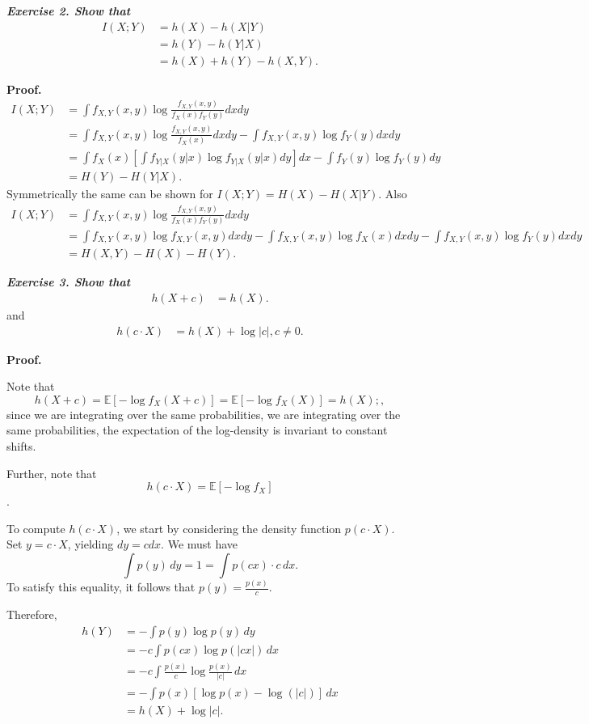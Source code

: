 \documentclass[13pt]{article}
\begin{document}
\textbf{\textit{Exercise 2.   Show that}}
\begin{align*}
I(X; Y) &= h(X) - h(X | Y) \\
		&= h(Y) - h(Y | X) \\
        &= h(X) + h(Y) - h(X, Y).
\end{align*}

\textbf{Proof.}
\begin{align*}
I(X;Y)&=\int f_{X,Y}(x,y)\log\frac{f_{X,Y}(x,y)}{f_X(x)f_Y(y)}dxdy\\
&=\int f_{X,Y}(x,y)\log\frac{f_{X,Y}(x,y)}{f_X(x)}dxdy-\int f_{X,Y}(x,y)\log f_Y(y)dxdy\\
&=\int f_X(x) \left [ \int f_{Y|X}(y|x)\log f_{Y|X}(y|x)dy \right ] dx-\int f_{Y}(y)\log f_Y(y)dy\\
&=H(Y)-H(Y|X). 
\end{align*}
Symmetrically the same can be shown for $I(X;Y)=H(X)-H(X|Y).$ Also
\begin{align*}
I(X;Y)&=\int f_{X,Y}(x,y)\log\frac{f_{X,Y}(x,y)}{f_X(x)f_Y(y)}dxdy\\
&=\int f_{X,Y}(x,y)\log f_{X,Y}(x,y)dxdy-\int f_{X,Y}(x,y)\log f_X(x)dxdy-\int f_{X,Y}(x,y)\log f_Y(y)dxdy\\
&=H(X,Y)-H(X)-H(Y).
\end{align*}

\textbf{\textit{Exercise 3.   Show that}}
\begin{align*}
h(X + c) &= h(X).
\end{align*}
and
\begin{align*}
h(c \cdot X) &= h(X) + \log \lvert c\rvert, c\neq 0.
\end{align*}

\textbf{Proof.} 

Note that
\[
h(X+c) = \mathbb{E} [-\log f_X(X+c)] = \mathbb{E}[-\log f_X(X)] = h(X);,
\]
since we are integrating over the same probabilities, we are integrating over the same probabilities, the expectation of the log-density is invariant to constant shifts.

Further, note that
\[
h(c \cdot X) = \mathbb{E} [- \log f_X]
\].

To compute $h(c \cdot X)$, we start by considering the density function $p(c \cdot X)$.  Set $y = c \cdot X$, yielding $dy = c dx$.  We must have
\[
\int p(y) \, dy = 1 = \int p(cx) \cdot c \, dx.
\]
To satisfy this equality, it follows that  $p(y) = \frac{p(x)}{c}$.

Therefore,
\begin{align*}
h(Y) &= - \int p(y) \log p(y) \, dy \\
	 &= - c \int p(cx) \log p(|cx|) \, dx \\
     &= -c \int \frac{p(x)}{c} \log \frac{p(x)}{|c|} \, dx \\
     &= - \int p(x) [\log p(x) - \log(|c|)] \, dx \\
     &= h(X) + \log |c|.
\end{align*}
\end{document}
